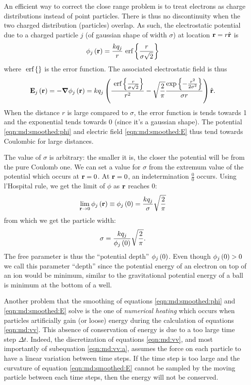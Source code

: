 An efficient way to correct the close range problem is to treat electrons as
charge distributions instead of point particles. There is thus no
discontinuity when the two charged distribution (particles) overlap. As such,
the electrostatic potential due to a charged particle $j$
(of gaussian shape of width $\sigma$) at location $\textbf{r} = r \hat{\textbf{r}}$ is
\begin{align}
\phi_{j}\left( \textbf{r} \right) & = \frac{k q_j}{r} ~\textrm{erf} \left\{\frac{r}{\sigma \sqrt{2}}\right\}
\label{eqn:md:smoothed:phi}
\end{align}
where $~\textrm{erf} \left\{\right\}$ is the error function. The associated electrostatic field is thus
\begin{align}
\textbf{E}_{j}\left( \textbf{r} \right) & = -\bm{\nabla} \phi_j\left( \textbf{r} \right) = k q_j \left( 
    \frac{ ~\textrm{erf} \left\{\frac{r}{\sigma\sqrt{2}}\right\} }{r^2}
    - \sqrt{\frac{2}{\pi}} \frac{ \exp{ \left\{ -\frac{r^2}{2 \sigma^2} \right\}} }{\sigma r}
 \right) \hat{\textbf{r}}.
\label{eqn:md:smoothed:E}
\end{align}
When the distance $r$ is large compared to $\sigma$, the error function
is tends towards 1 and the exponential tends towards 0 (since it's a gaussian
shape). The potential \eqref{eqn:md:smoothed:phi} and electric field
\eqref{eqn:md:smoothed:E} thus tend towards Coulombic for large distances.

The value of $\sigma$ is arbitrary: the smaller it is, the closer the potential
will be from the pure Coulomb one. We can set a value for $\sigma$ from the
extremum value of the potential which occurs at $\textbf{r} = 0$. At $\textbf{r} = 0$, an
indetermination $\frac{0}{0}$ occurs. Using l'Hospital rule, we get the limit
of $\phi$ as $\textbf{r}$ reaches 0:
\begin{align}
\lim_{\textbf{r} \rightarrow 0} \phi_j\left( \textbf{r} \right)
    & \equiv \phi_j\left( 0 \right) = \frac{ k q_j }{ \sigma } \sqrt{\frac{2}{\pi}}
\end{align}
from which we get the particle width:
\begin{align}
\sigma & = \frac{ k q_j }{ \phi_j\left( 0 \right) } \sqrt{ \frac{2}{\pi}}.
\label{eqn:md:sigma}
\end{align}
The free parameter is thus the ``potential depth'' $\phi_j\left( 0 \right)$. Even
though $\phi_j\left( 0 \right) > 0$ we call this parameter ``depth'' since the potential
energy of an electron on top of an ion would be minimum, similar to the
gravitational potential energy of a ball is minimum at the bottom of a well.

Another problem that the smoothing of equations \eqref{eqn:md:smoothed:phi} and
\eqref{eqn:md:smoothed:E} solve is the one of \textit{numerical heating} which
occurs when particles artificially gain (or loose) energy during the
calculation of equations \eqref{eqn:md:vv}. This absence of conservation of
energy is due to a too large time step $\Delta t$. Indeed, the
discretization of equations \eqref{eqn:md:vv}, and most importantly of
subequation \eqref{eqn:md:vv:a}, assumes the force on each particle to have a
linear variation between time steps. If the time step is too large and the
curvature of equation \eqref{eqn:md:smoothed:E} cannot be sampled by the moving
particle between each time steps, then the energy will not be conserved.



